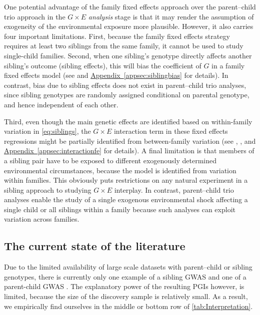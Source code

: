 \documentclass[12pt,a4paper]{article}
\begin{document}
\begin{bibunit}
One potential advantage of the family fixed effects approach over the parent--child trio approach in the $G \times E$ \textit{analysis} stage is that it may render the assumption of exogeneity of the environmental exposure more plausible. However, it also carries four important limitations. First, because the family fixed effects strategy requires at least two siblings from the same family, it cannot be used to study single-child families. Second, when one sibling's genotype directly affects another sibling's outcome (sibling effects), this will bias the coefficient of $G$ in a family fixed effects model (see \cite{kong2020family} and \hyperref[appsec:siblingbias]{Appendix~\ref*{appsec:siblingbias}} for details).
In contrast, bias due to sibling effects does not exist in parent--child trio analyses, since sibling genotypes are randomly assigned conditional on parental genotype, and hence independent of each other. 

Third, even though the main genetic effects are identified based on within-family variation in  \autoref{eq:siblings}, the $G\times{}E$ interaction term in these fixed effects regressions might be partially identified from between-family variation (see \cite{shaver2019interpreting}, \cite{giesselmann2022interactions}, and \hyperref[appsec:interactionfe]{Appendix~\ref*{appsec:interactionfe}} for details). A final limitation is that members of a sibling pair have to be exposed to different exogenously determined environmental circumstances, because the model is identified from variation within families. This obviously puts restrictions on any natural experiment in a sibling approach to studying $G\times E$ interplay. In contrast, parent--child trio analyses enable the study of a single exogenous environmental shock affecting a single child or all siblings within a family because such analyses can exploit variation across families. 

\subsection{The current state of the literature} \label{subsec:current}
Due to the limited availability of large scale datasets with parent--child or sibling genotypes, there is currently only one example of a sibling GWAS \citep{Howe2022} and one of a parent-child GWAS \citep[referred to as a `family GWAS' in][]{Tan2024}. The explanatory power of the resulting PGIs however, is limited, because the size of the discovery sample is relatively small. As a result, we empirically find ourselves in the middle or bottom row of \autoref{tab:Interpretation}.  


\end{bibunit}
\end{document}
